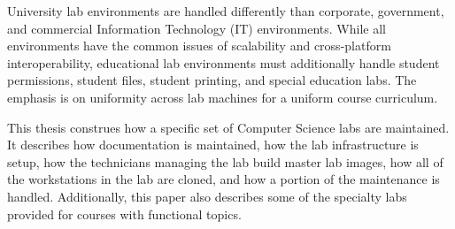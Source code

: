 \thispagestyle{empty}

University lab environments are handled differently than corporate, government, and commercial Information Technology (IT) environments.  While all environments have the common issues of scalability and cross-platform interoperability, educational lab environments must additionally handle student permissions, student files, student printing, and special education labs.  The emphasis is on uniformity across lab machines for a uniform course curriculum. 

This thesis construes how a specific set of Computer Science labs are maintained.  It describes how documentation is maintained, how the lab infrastructure is setup, how the technicians managing the lab build master lab images, how all of the workstations in the lab are cloned, and how a portion of the maintenance is handled.  Additionally, this paper also describes some of the specialty labs provided for courses with functional topics. 
